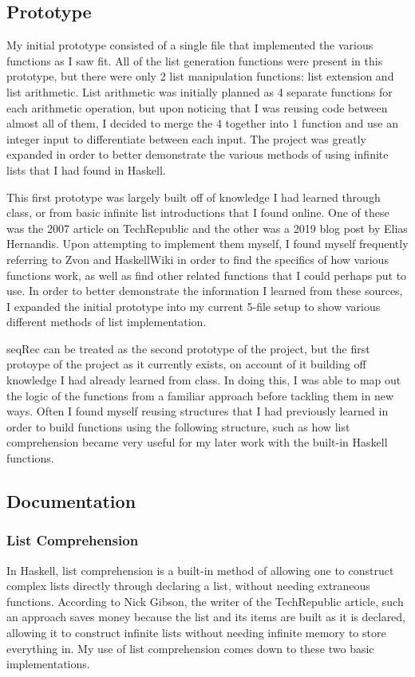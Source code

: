 \documentclass{article}
\theoremstyle{theorem}
\theoremstyle{definition}
\theoremstyle{remark}
\begin{document}
\subsection{Prototype}
My initial prototype consisted of a single file that implemented the various functions as I saw fit. All of the list generation functions were present in this prototype, but there were only 2 list manipulation functions: list extension and list arithmetic. List arithmetic was initially planned as 4 separate functions for each arithmetic operation, but upon noticing that I was reusing code between almost all of them, I decided to merge the 4 together into 1 function and use an integer input to differentiate between each input. The project was greatly expanded in order to better demonstrate the various methods of using infinite lists that I had found in Haskell.

\medskip\noindent
This first prototype was largely built off of knowledge I had learned through class, or from basic infinite list introductions that I found online. One of these was the 2007 article on TechRepublic and the other was a 2019 blog post by Elias Hernandis. Upon attempting to implement them myself, I found myself frequently referring to Zvon and HaskellWiki in order to find the specifics of how various functions work, as well as find other related functions that I could perhaps put to use. In order to better demonstrate the information I learned from these sources, I expanded the initial prototype into my current 5-file setup to show various different methods of list implementation.

\medskip\noindent
seqRec can be treated as the second prototype of the project, but the first protoype of the project as it currently exists, on account of it building off knowledge I had already learned from class. In doing this, I was able to map out the logic of the functions from a familiar approach before tackling them in new ways. Often I found myself reusing structures that I had previously learned in order to build functions using the following structure, such as how list comprehension became very useful for my later work with the built-in Haskell functions.

\subsection{Documentation}
\subsubsection{List Comprehension}
In Haskell, list comprehension is a built-in method of allowing one to construct complex lists directly through declaring a list, without needing extraneous functions. According to Nick Gibson, the writer of the TechRepublic article, such an approach saves money because the list and its items are built as it is declared, allowing it to construct infinite lists without needing infinite memory to store everything in. My use of list comprehension comes down to these two basic implementations.
\end{document}
